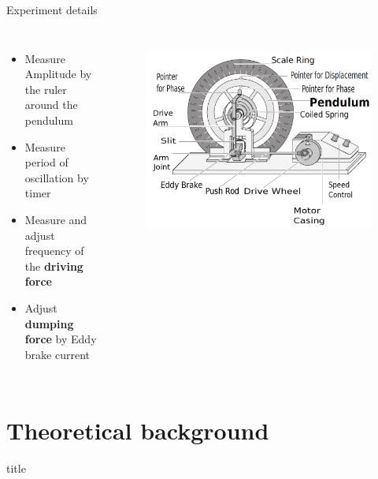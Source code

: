 \documentclass{beamer}
\begin{document}
\begin{frame}{Experiment details}
\begin{columns}
\begin{itemize}
    \item<1-> Measure Amplitude by the ruler around the pendulum
    \item<2-> Measure period of oscillation by timer
    \item<3-> Measure and adjust frequency of the \textbf{driving force}
    \item<4-> Adjust \textbf{dumping force} by Eddy brake current
\end{itemize}
\begin{figure}[t]
	\centering
	\includegraphics[width=1\linewidth]{images/pendulum_diagram.png}
	\label{fig:system-diagram}
\end{figure}
\end{columns}
\end{frame}

\section{Theoretical background}

\begin{frame}{}
\begin{beamercolorbox}[sep=8pt,center,shadow=true,rounded=true]{title}
    \par%
\end{beamercolorbox}
    
\end{frame}
\end{document}
